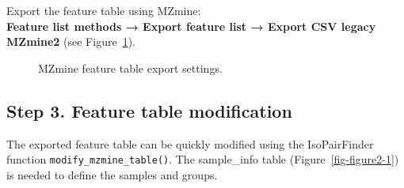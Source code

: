\documentclass[
  letterpaper,
  DIV=11,
  numbers=noendperiod]{scrreprt}
\begin{document}
Export the feature table using MZmine:\\
\textbf{Feature list methods → Export feature list → Export CSV legacy
MZmine2} (see Figure~\ref{fig-figure2-6}).

\begin{figure}


\caption{\label{fig-figure2-6}MZmine feature table export settings.}

\end{figure}%

\subsection{Step 3. Feature table
modification}\label{step-3.-feature-table-modification-2}

The exported feature table can be quickly modified using the
IsoPairFinder function \texttt{modify\_mzmine\_table()}. The
sample\_info table (Figure~\ref{fig-figure2-1}) is needed to define the
samples and groups.
\end{document}

